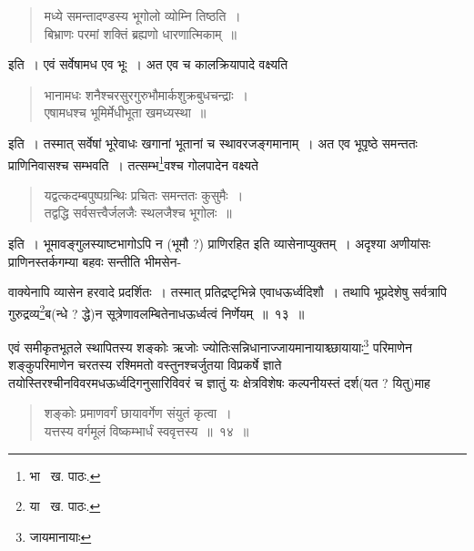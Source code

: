 \documentclass[11pt, openany]{book}
\begin{document}
\begin{quote}
{\qt मध्ये समन्तादण्डस्य भूगोलो व्योम्नि तिष्ठति~।\\
बिभ्राणः परमां शक्तिं ब्रह्यणो धारणात्मिकाम्~॥}
\end{quote}

\noindent इति~। एवं सर्वेषामध एव भूः~। अत एव च कालक्रियापादे वक्ष्यति\textendash

\begin{quote}
{\qt भानामधः शनैश्चरसुरगुरुभौमार्कशुक्रबुधचन्द्राः~।\\
एषामधश्च भूमिर्मेधीभूता खमध्यस्था~॥}
\end{quote}

\noindent इति~। तस्मात् सर्वेषां भूरेवाधः खगानां भूतानां च स्थावरजङ्गमानाम्~। अत एव भूपृष्ठे समन्ततः प्राणिनिवासश्च सम्भवति~। तत्सम्भ\renewcommand{\thefootnote}{५}\footnote{भा \textendash\ ख. पाठः.}वश्च गोलपादेन वक्ष्यते\textendash

\begin{quote}
{\qt यद्वत्कदम्बपुष्पग्रन्थिः प्रचितः समन्ततः कुसुमैः~।\\
तद्वद्धि सर्वसत्त्वैर्जलजैः स्थलजैश्च भूगोलः~॥}
\end{quote}

\noindent इति~। भूमावङ्गुलस्याष्टभागोऽपि न (भूमौ ?) प्राणिरहित इति व्यासेनाप्युक्तम्~। अदृश्या अणीयांसः प्राणिनस्तर्कगम्या बहवः सन्तीति भीमसेन-

\newpage

\noindent वाक्येनापि व्यासेन हरवादे प्रदर्शितः~। तस्मात् प्रतिद्रष्टृभिन्ने एवाधऊर्ध्वदिशौ~। तथापि भूप्रदेशेषु सर्वत्रापि गुरुद्रव्य\renewcommand{\thefootnote}{१}\footnote{या \textendash\ ख. पाठः.}ब(न्धे ? द्धे)न
सूत्रेणावलम्बितेनाधऊर्ध्वत्वं निर्णेयम्~॥~१३~॥\\
\begin{sloppypar} 
\indent एवं समीकृतभूतले स्थापितस्य शङ्कोः ऋजोः ज्योतिःसन्निधानाज्जायमानायाश्च्छायायाः\renewcommand{\thefootnote}{२}\footnote{जायमानायाः} परिमाणेन शङ्कुपरिमाणेन चरतस्य रश्मिमतो वस्तुनश्चर्जुतया विप्रकर्षे ज्ञाते तयोस्तिरश्चीनविवरमधऊर्ध्वदिगनुसारिविवरं च ज्ञातुं यः क्षेत्रविशेषः कल्पनीयस्तं दर्श(यत ? यितु)माह\textendash
\end{sloppypar} 

\begin{quote}
{\ab शङ्कोः प्रमाणवर्गं छायावर्गेण संयुतं कृत्वा~।\\
यत्तस्य वर्गमूलं विष्कम्भार्धं स्ववृत्तस्य~॥~१४~॥}
\end{quote}
\end{document}
